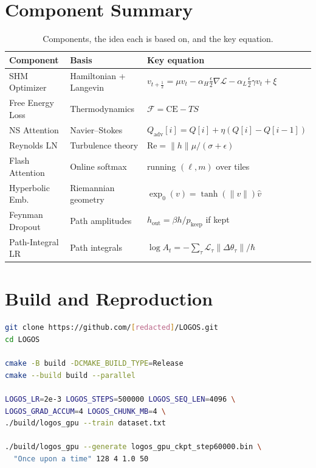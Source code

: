 \documentclass[11pt,a4paper]{article}
\newcommand{\calF}{\mathcal{F}}
\newcommand{\calL}{\mathcal{L}}
\newcommand{\CE}{\mathrm{CE}}
\begin{document}
\appendix

\section{Component Summary}
\label{app:summary}

\begin{table}[htbp]
\centering
\caption{Components, the idea each is based on, and the key equation.}
\label{tab:physics_summary}
\small
\begin{tabular}{p{2.6cm}p{2.8cm}p{6.6cm}}
\toprule
\textbf{Component} & \textbf{Basis} & \textbf{Key equation}\\
\midrule
SHM Optimizer
  & Hamiltonian + Langevin
  & $v_{t+\frac{1}{2}}=\mu v_t - \alpha_H\frac{\epsilon}{2}\nabla\calL - \alpha_L\frac{\epsilon}{2}\gamma v_t+\xi$\\[3pt]
Free Energy Loss
  & Thermodynamics
  & $\calF=\CE-TS$\\[3pt]
NS Attention
  & Navier--Stokes
  & $Q_{\mathrm{adv}}[i]=Q[i]+\eta(Q[i]-Q[i{-}1])$\\[3pt]
Reynolds LN
  & Turbulence theory
  & $\mathrm{Re}=\|h\|\mu/(\sigma+\epsilon)$\\[3pt]
Flash Attention
  & Online softmax
  & running $(\ell,m)$ over tiles\\[3pt]
Hyperbolic Emb.
  & Riemannian geometry
  & $\exp_0(v)=\tanh(\|v\|)\hat{v}$\\[3pt]
Feynman Dropout
  & Path amplitudes
  & $h_{\mathrm{out}}=\beta h/p_{\mathrm{keep}}$ if kept\\[3pt]
Path-Integral LR
  & Path integrals
  & $\log A_t = {-}\sum_\tau \calL_\tau\|\Delta\theta_\tau\|/\hbar$\\
\bottomrule
\end{tabular}
\end{table}

\section{Build and Reproduction}
\label{app:build}

\begin{lstlisting}[language=bash, caption={Build and train on a CUDA GPU.}, basicstyle=\ttfamily\scriptsize]
git clone https://github.com/[redacted]/LOGOS.git
cd LOGOS

cmake -B build -DCMAKE_BUILD_TYPE=Release
cmake --build build --parallel

LOGOS_LR=2e-3 LOGOS_STEPS=500000 LOGOS_SEQ_LEN=4096 \
LOGOS_GRAD_ACCUM=4 LOGOS_CHUNK_MB=4 \
./build/logos_gpu --train dataset.txt

./build/logos_gpu --generate logos_gpu_ckpt_step60000.bin \
  "Once upon a time" 128 4 1.0 50
\end{lstlisting}
\end{document}
